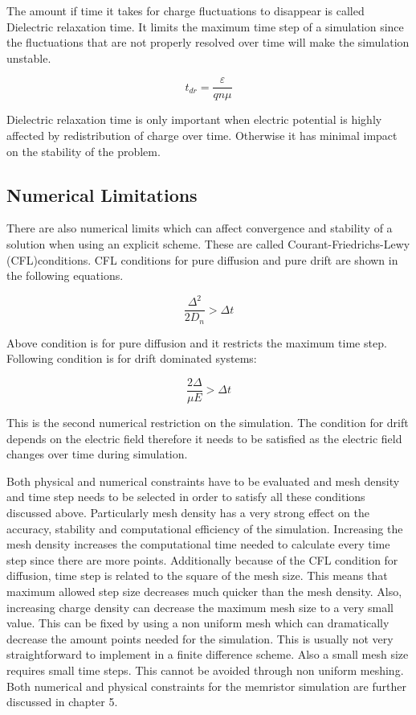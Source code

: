 \begin{doublespace}
The amount if time it takes for charge fluctuations to disappear is called Dielectric relaxation time. It limits the maximum time step of a simulation since the fluctuations that are not properly resolved over time will make the simulation unstable.

\begin{equation}
t_{dr}=\frac{\varepsilon}{q n \mu}
\label{tdr}
\end{equation}

Dielectric relaxation time is only important when electric potential is highly affected by redistribution of charge over time. Otherwise it has minimal impact on the stability of the problem.
\subsection{Numerical Limitations}

There are also numerical limits which can affect convergence and stability of a solution when using an explicit scheme. These are called Courant-Friedrichs-Lewy (CFL)conditions. CFL conditions for pure diffusion and pure drift are shown in the following equations.

\begin{equation}
\frac{\Delta ^2}{2 D_n}>\Delta t
\label{CFL_Diff}
\end{equation}

Above condition is for pure diffusion and it restricts the maximum time step. Following condition is for drift dominated systems:

\begin{equation}
\frac{2 \Delta }{\mu E}>\Delta t
\label{CFL_Drift}
\end{equation}

This is the second numerical restriction on the simulation. The condition for drift depends on the electric field therefore it needs to be satisfied as the electric field changes over time during simulation.

Both physical and numerical constraints have to be evaluated and mesh density and time step needs to be selected in order to satisfy all these conditions discussed above. Particularly mesh density has a very strong effect on the accuracy, stability and computational efficiency of the simulation. Increasing the mesh density increases the computational time needed to calculate every time step since there are more points. Additionally because of the CFL condition for diffusion, time step is related to the square of the mesh size. This means that maximum allowed step size decreases much quicker than the mesh density. Also, increasing charge density can decrease the maximum mesh size to a very small value. This can be fixed by using a non uniform mesh which can dramatically decrease the amount points needed for the simulation. This is usually not very straightforward to implement in a finite difference scheme. Also a small mesh size requires small time steps. This cannot be avoided through non uniform meshing. Both numerical and physical constraints for the memristor simulation are further discussed in chapter 5.


\end{doublespace}
